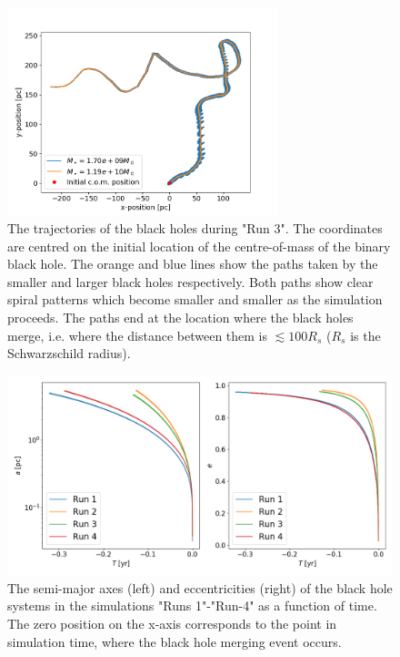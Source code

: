 \documentclass[english, oneside]{HYgradu}
\begin{document}
\begin{figure}[h]
	\centering	
	\includegraphics[width=0.7\textwidth]{Run3_Trajectory.png}	
	\caption{The trajectories of the black holes during "Run 3". The coordinates are centred on the initial location of the centre-of-mass of the binary black hole. The orange and blue lines show the paths taken by the smaller and larger black holes respectively. Both paths show clear spiral patterns which become smaller and smaller as the simulation proceeds. The paths end at the location where the black holes merge, i.e. where the distance between them is $\lesssim 100 R_s$ ($R_s$ is the Schwarzschild radius).}
	\label{figure:run3_traj}
\end{figure}

\begin{figure}[h]
	\centering
	\includegraphics[width=\textwidth]{semi_major_and_ecc.png}
	\caption{The semi-major axes (left) and eccentricities (right) of the black hole systems in the simulations "Runs 1"-"Run-4" as a function of time. The zero position on the x-axis corresponds to the point in simulation time, where the black hole merging event occurs.}
	\label{figure:semi_and_ecc}
\end{figure}
\end{document}

